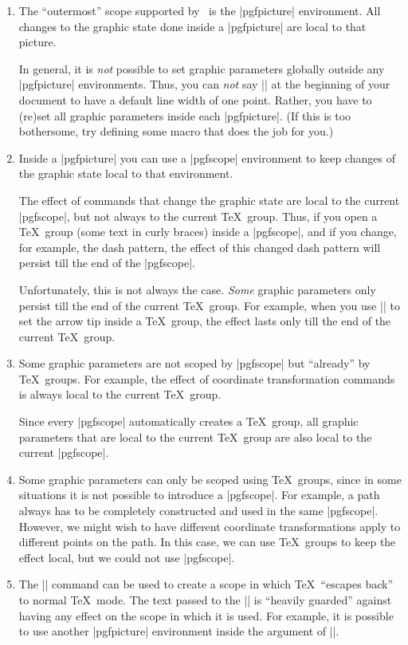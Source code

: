 \begin{enumerate}
\item
  The ``outermost'' scope supported by \pgfname\ is the |{pgfpicture}|
  environment. All changes to the graphic state done inside a
  |{pgfpicture}| are local to that picture.

  In general, it is \emph{not} possible to set graphic parameters
  globally outside any |{pgfpicture}| environments. Thus, you can
  \emph{not} say |\pgfsetlinewidth{1pt}| at the beginning of your
  document to have a default line width of one point. Rather, you have
  to (re)set all graphic parameters inside each |{pgfpicture}|. (If
  this is too bothersome, try defining some macro that does the job
  for you.)
\item
  Inside a |{pgfpicture}| you can use a |{pgfscope}| environment to
  keep changes of the graphic state local to that environment.

  The effect of commands that change the graphic state are local to
  the current |{pgfscope}|, but not always to the current \TeX\
  group. Thus, if you open a \TeX\ group (some text in curly braces)
  inside a |{pgfscope}|, and if you change, for example, the dash
  pattern, the effect of this changed dash pattern will persist till
  the end of the |{pgfscope}|.

  Unfortunately, this is not always the case. \emph{Some} graphic
  parameters only persist till the end of the current \TeX\ group. For
  example, when you use |\pgfsetarrows| to set the arrow tip
  inside a \TeX\ group, the effect lasts only till the end of the
  current \TeX\ group.
\item
  Some graphic parameters are not scoped by |{pgfscope}| but
  ``already'' by \TeX\ groups. For example, the effect of coordinate
  transformation commands is always local to the current \TeX\
  group.

  Since every |{pgfscope}| automatically creates a \TeX\ group, all
  graphic parameters that are local to the current \TeX\ group are
  also local to the current |{pgfscope}|.
\item
  Some graphic parameters can only be scoped using \TeX\ groups, since
  in some situations it is not possible to introduce a
  |{pgfscope}|. For example, a path always has to be completely
  constructed and used in the same |{pgfscope}|. However, we might
  wish to have different coordinate transformations apply to different
  points on the path. In this case, we can use \TeX\ groups to keep
  the effect local, but we could not use |{pgfscope}|.
\item
  The |\pgftext| command can be used to create a scope in which \TeX\
  ``escapes back'' to normal \TeX\ mode. The text passed to the
  |\pgftext| is ``heavily guarded'' against having any effect on the
  scope in which it is used. For example, it is possible to use
  another  |{pgfpicture}| environment inside the argument of
  |\pgftext|.
\end{enumerate}


